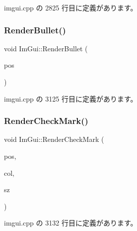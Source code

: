  imgui.\+cpp の 2825 行目に定義があります。

\mbox{\label{namespace_im_gui_a2d0e4160081b3953fc8f88e2d8e8da15}} 
\subsubsection{\texorpdfstring{Render\+Bullet()}{RenderBullet()}}
{\footnotesize\ttfamily void Im\+Gui\+::\+Render\+Bullet (\begin{DoxyParamCaption}\item[{\mbox{\hyperlink{struct_im_vec2}{Im\+Vec2}}}]{pos }\end{DoxyParamCaption})}



 imgui.\+cpp の 3125 行目に定義があります。

\mbox{\label{namespace_im_gui_a6adfc430445ed42a65556ffb0d58a8b8}} 
\subsubsection{\texorpdfstring{Render\+Check\+Mark()}{RenderCheckMark()}}
{\footnotesize\ttfamily void Im\+Gui\+::\+Render\+Check\+Mark (\begin{DoxyParamCaption}\item[{\mbox{\hyperlink{struct_im_vec2}{Im\+Vec2}}}]{pos,  }\item[{\mbox{\hyperlink{imgui_8h_a118cff4eeb8d00e7d07ce3d6460eed36}{Im\+U32}}}]{col,  }\item[{float}]{sz }\end{DoxyParamCaption})}



 imgui.\+cpp の 3132 行目に定義があります。

\mbox{\label{namespace_im_gui_a4715686ee0c613e8518c0f5e92c358ce}} 
